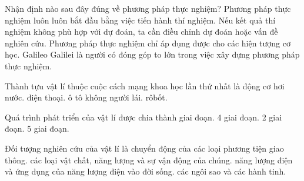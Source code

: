 \begin{ex}
Nhận định nào sau đây đúng về phương pháp thực nghiệm?
\choiceTF
{Phương pháp thực nghiệm luôn luôn bắt đầu bằng việc tiến hành thí nghiệm.}
{\True Nếu kết quả thí nghiệm không phù hợp với dự đoán, ta cần điều chỉnh dự đoán hoặc vấn đề nghiên cứu.}
{Phương pháp thực nghiệm chỉ áp dụng được cho các hiện tượng cơ học.}
{\True Galileo Galilei là người có đóng góp to lớn trong việc xây dựng phương pháp thực nghiệm.}
\end{ex}
\begin{ex}
Thành tựu vật lí thuộc cuộc cách mạng khoa học lần thứ nhất là
\choice
{\True động cơ hơi nước.}
{điện thoại.}
{ô tô không người lái.}
{rôbốt.}
\end{ex}

\begin{ex}
Quá trình phát triển của vật lí được chia thành 
\choice
{ giai đoạn.}
{4 giai đoạn.}
{2 giai đoạn.}
{5 giai đoạn.}
\end{ex}

\begin{ex}
Đối tượng nghiên cứu của vật lí là
\choice
{chuyển động của các loại phương tiện giao thông.}
{\True các loại vật chất, năng lượng và sự vận động của chúng.}
{năng lượng điện và ứng dụng của năng lượng điện vào đời sống.}
{các ngôi sao và các hành tinh.}
\end{ex}

